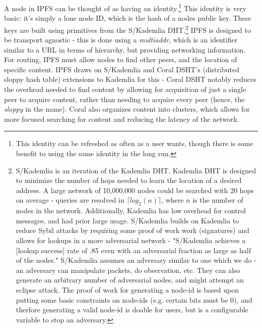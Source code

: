 \documentclass[12pt]{report}
\begin{document}
A node in IPFS can be thought of as having an identity.\footnote{This identity can be refreshed as often as a user wants, though there is some benefit to using the same identity in the long run.} This identity is very basic: it's simply a lone node ID, which is the hash of a nodes public key. These keys are built using primitives from the S/Kademlia DHT.\footnote{S/Kademlia is an iteration of the Kademlia DHT. Kademlia DHT is designed to minimize the number of hops needed to learn the location of a desired address.\cite{kademlia} A large network of 10,000,000 nodes could be searched with 20 hops on average - queries are resolved in $\lceil log_2(n) \rceil$, where $n$ is the number of nodes in the network.\cite{ipfs} Additionally, Kademlia has low overhead for control messages, and had prior large usage.\cite{ipfs} S/Kademlia builds on Kademlia to reduce Sybil attacks by requiring some proof of work work (signatures) and allows for lookups in a more adversarial network - "S/Kademlia achieves a [lookup success] rate of .85 even with an adversarial fraction as large as half of the nodes."\cite{ipfs} S/Kademlia assumes an adversary similar to one which we do - an adversary can manipulate packets, do observation, etc. They can also generate an arbitrary number of adversarial nodes, and might attempt an eclipse attack.\cite{skademlia} The proof of work for generating a node-id is based upon putting some basic constraints on node-ids (e.g. certain bits must be 0), and therfore generating a valid node-id is doable for users, but is a configurable variable to stop an adversary.\cite{skademlia}} IPFS is designed to be transport agnostic - this is done using a \emph{multiaddr}, which is an identifier similar to a URL in terms of hierarchy, but providing networking information. For routing, IPFS must allow nodes to find other peers, and the location of specific content. IPFS draws on S/Kademlia and Coral DSHT's (distributed sloppy hash table) extensions to Kademlia for this - Coral DSHT notably reduces the overhead needed to find content by allowing for acquisition of just a single peer to acquire content, rather than needing to acquire every peer (hence, the \emph{sloppy} in the name). Coral also organizes content into clusters, which allows for more focused searching for content and reducing the latency of the network.
\end{document}
